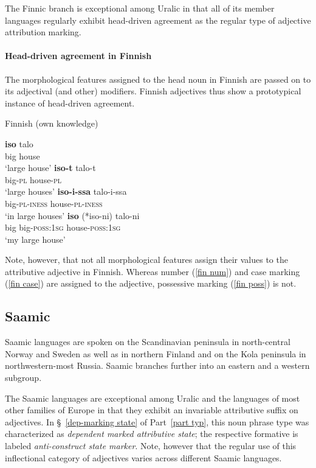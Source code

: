 The Finnic branch is exceptional among Uralic in that all of its member languages regularly exhibit head-driven agreement as the regular type of adjective attribution marking.

\paragraph{Head-driven agreement in Finnish} \label{finnish synchr}
The morphological features assigned to the head noun in Finnish are passed on to its adjectival (and other) modifiers. Finnish adjectives thus show a prototypical instance of head-driven agreement. 
\begin{exe}
\ex \rm{Finnish (own knowledge)}
\begin{xlist}
\ex
\gll	\textbf{iso} talo\\
	big house\\
\glt	‘large house’
\label{fin num}
\ex \gll	\textbf{iso-t} talo-t\\
	big-\textsc{pl} house-\textsc{pl}\\
\glt	‘large houses’
\ex \label{fin case}
\gll	\textbf{iso-i-ssa}	talo-i-ssa\\
	big-\textsc{pl}-\textsc{iness} house-\textsc{pl}-\textsc{iness}\\
\glt	‘in large houses’
\label{fin poss}
\ex 	
\gll	\textbf{iso} {(*iso-ni)} talo-ni\\
	big big-\textsc{poss:1sg} house-\textsc{poss:1sg}\\
\glt	‘my large house’
\end{xlist}
\end{exe}
Note, however, that not all morphological features assign their values to the attributive adjective in Finnish. Whereas number (\ref{fin num}) and case marking (\ref{fin case}) are assigned to the adjective, possessive marking (\ref{fin poss}) is not.

\subsection{Saamic}\label{saami synchr}
Saamic languages are spoken on the Scandinavian peninsula in north-central Norway and Sweden as well as in northern Finland and on the Kola peninsula in northwestern-most Russia. Saamic branches further into an eastern and a western subgroup.

The Saamic languages are exceptional among Uralic and the languages of most other families of Europe in that they exhibit an invariable attributive suffix on adjectives. In \S~\ref{dep-marking state} of Part~\ref{part typ}, this noun phrase type was characterized as \textit{dependent marked attributive state}; the respective formative is labeled \textit{anti-construct state marker}. Note, however that the regular use of this inflectional category of adjectives varies across different Saamic languages.


